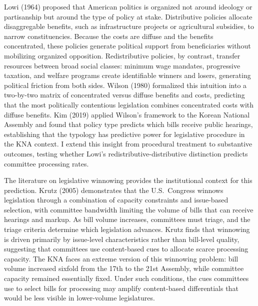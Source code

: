 \documentclass[11pt]{article}
\begin{document}
Lowi (1964) proposed that American politics is organized not around ideology or partisanship but around the type of policy at stake. Distributive policies allocate disaggregable benefits, such as infrastructure projects or agricultural subsidies, to narrow constituencies. Because the costs are diffuse and the benefits concentrated, these policies generate political support from beneficiaries without mobilizing organized opposition. Redistributive policies, by contrast, transfer resources between broad social classes: minimum wage mandates, progressive taxation, and welfare programs create identifiable winners and losers, generating political friction from both sides. Wilson (1980) formalized this intuition into a two-by-two matrix of concentrated versus diffuse benefits and costs, predicting that the most politically contentious legislation combines concentrated costs with diffuse benefits. Kim (2019) applied Wilson's framework to the Korean National Assembly and found that policy type predicts which bills receive public hearings, establishing that the typology has predictive power for legislative procedure in the KNA context. I extend this insight from procedural treatment to substantive outcomes, testing whether Lowi's redistributive-distributive distinction predicts committee processing rates.

The literature on legislative winnowing provides the institutional context for this prediction. Krutz (2005) demonstrates that the U.S.\ Congress winnows legislation through a combination of capacity constraints and issue-based selection, with committee bandwidth limiting the volume of bills that can receive hearings and markup. As bill volume increases, committees must triage, and the triage criteria determine which legislation advances. Krutz finds that winnowing is driven primarily by issue-level characteristics rather than bill-level quality, suggesting that committees use content-based cues to allocate scarce processing capacity. The KNA faces an extreme version of this winnowing problem: bill volume increased sixfold from the 17th to the 21st Assembly, while committee capacity remained essentially fixed. Under such conditions, the cues committees use to select bills for processing may amplify content-based differentials that would be less visible in lower-volume legislatures.
\end{document}
